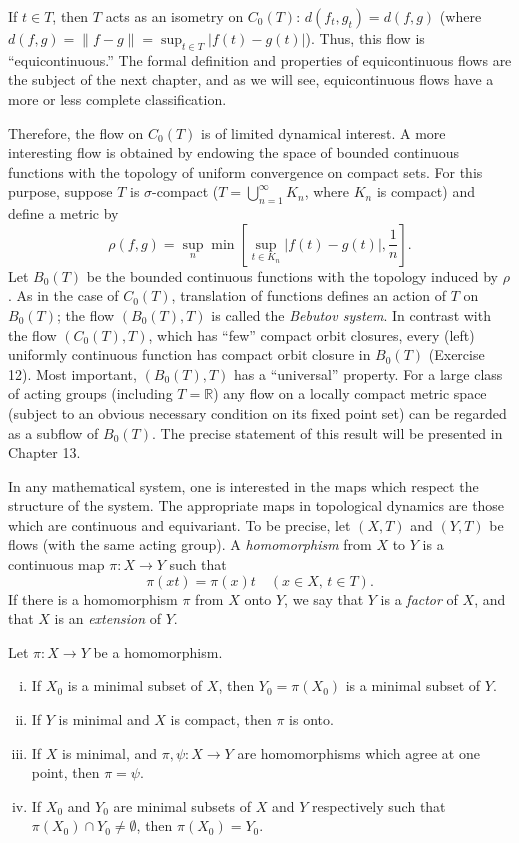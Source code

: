 If $t \in T$, then $T$ acts as an isometry on $C_0(T)$: $d(f_t, g_t) = d(f, g)$ (where $d(f, g) = \|f - g\| = \sup_{t \in T} |f(t) - g(t)|$). Thus, this flow is “equicontinuous.” The formal definition and properties of equicontinuous flows are the subject of the next chapter, and as we will see, equicontinuous flows have a more or less complete classification.

Therefore, the flow on $C_0(T)$ is of limited dynamical interest. A more interesting flow is obtained by endowing the space of bounded continuous functions with the topology of uniform convergence on compact sets. For this purpose, suppose $T$ is $\sigma$-compact ($T = \bigcup_{n=1}^{\infty} K_n$, where $K_n$ is compact) and define a metric by
\[
    \rho(f, g) = \sup_n \min \left[ \sup_{t \in K_n} |f(t) - g(t)|, \frac{1}{n} \right].
\]
Let $B_0(T)$ be the bounded continuous functions with the topology induced by $\rho$. As in the case of $C_0(T)$, translation of functions defines an action of $T$ on $B_0(T)$; the flow $(B_0(T), T)$ is called the \textit{Bebutov system}. In contrast with the flow $(C_0(T), T)$, which has “few” compact orbit closures, every (left) uniformly continuous function has compact orbit closure in $B_0(T)$ (Exercise 12). Most important, $(B_0(T), T)$ has a “universal” property. For a large class of acting groups (including $T = \mathbb{R}$) any flow on a locally compact metric space (subject to an obvious necessary condition on its fixed point set) can be regarded as a subflow of $B_0(T)$. The precise statement of this result will be presented in Chapter 13.



In any mathematical system, one is interested in the maps which respect the structure of the system. The appropriate maps in topological dynamics are those which are continuous and equivariant. To be precise, let $(X, T)$ and $(Y, T)$ be flows (with the same acting group). A \textit{homomorphism} from $X$ to $Y$ is a continuous map $\pi : X \to Y$ such that
\[
    \pi(xt) = \pi(x)t \quad (x \in X, \, t \in T).
\]
If there is a homomorphism $\pi$ from $X$ onto $Y$, we say that $Y$ is a \textit{factor} of $X$, and that $X$ is an \textit{extension} of $Y$.



\begin{proposition}
    Let $\pi : X \to Y$ be a homomorphism.
    \begin{enumerate}[(i)]
        \item If $X_0$ is a minimal subset of $X$, then $Y_0 = \pi(X_0)$ is a minimal subset of $Y$.
        \item If $Y$ is minimal and $X$ is compact, then $\pi$ is onto.
        \item If $X$ is minimal, and $\pi, \psi : X \to Y$ are homomorphisms which agree at one point, then $\pi = \psi$.
        \item If $X_0$ and $Y_0$ are minimal subsets of $X$ and $Y$ respectively such that $\pi(X_0) \cap Y_0 \ne \emptyset$, then $\pi(X_0) = Y_0$.
    \end{enumerate}
\end{proposition}

